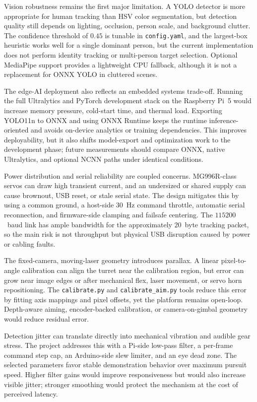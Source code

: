 \documentclass[lettersize,journal]{IEEEtran}
\begin{document}
Vision robustness remains the first major limitation. A YOLO detector is more appropriate for human tracking than HSV color segmentation, but detection quality still depends on lighting, occlusion, person scale, and background clutter. The confidence threshold of $0.45$ is tunable in \texttt{config.yaml}, and the largest-box heuristic works well for a single dominant person, but the current implementation does not perform identity tracking or multi-person target selection. Optional MediaPipe support provides a lightweight CPU fallback, although it is not a replacement for ONNX YOLO in cluttered scenes.

The edge-AI deployment also reflects an embedded systems trade-off. Running the full Ultralytics and PyTorch development stack on the Raspberry Pi~5 would increase memory pressure, cold-start time, and thermal load. Exporting YOLO11n to ONNX and using ONNX Runtime keeps the runtime inference-oriented and avoids on-device analytics or training dependencies. This improves deployability, but it also shifts model-export and optimization work to the development phase; future measurements should compare ONNX, native Ultralytics, and optional NCNN paths under identical conditions.

Power distribution and serial reliability are coupled concerns. MG996R-class servos can draw high transient current, and an undersized or shared supply can cause brownout, USB reset, or stale serial state. The design mitigates this by using a common ground, a host-side $30$~Hz command throttle, automatic serial reconnection, and firmware-side clamping and failsafe centering. The $115200$~baud link has ample bandwidth for the approximately $20$~byte tracking packet, so the main risk is not throughput but physical USB disruption caused by power or cabling faults.

The fixed-camera, moving-laser geometry introduces parallax. A linear pixel-to-angle calibration can align the turret near the calibration region, but error can grow near image edges or after mechanical flex, laser movement, or servo horn repositioning. The \texttt{calibrate.py} and \texttt{calibrate\_aim.py} tools reduce this error by fitting axis mappings and pixel offsets, yet the platform remains open-loop. Depth-aware aiming, encoder-backed calibration, or camera-on-gimbal geometry would reduce residual error.

Detection jitter can translate directly into mechanical vibration and audible gear stress. The project addresses this with a Pi-side low-pass filter, a per-frame command step cap, an Arduino-side slew limiter, and an eye dead zone. The selected parameters favor stable demonstration behavior over maximum pursuit speed. Higher filter gains would improve responsiveness but would also increase visible jitter; stronger smoothing would protect the mechanism at the cost of perceived latency.
\end{document}
